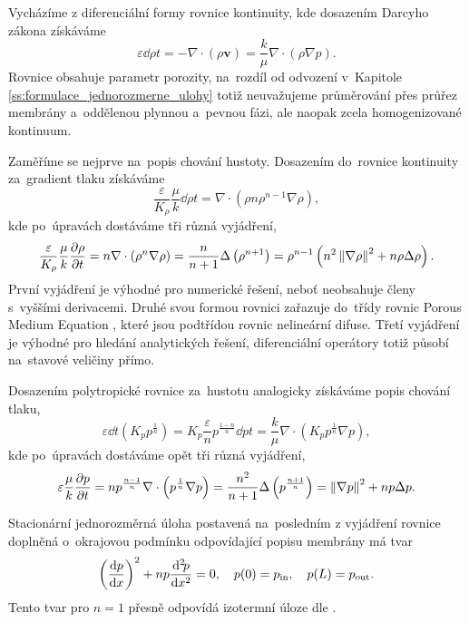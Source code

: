 Vycházíme z diferenciální formy rovnice kontinuity, kde dosazením Darcyho zákona získáváme
\begin{equation}
    \varepsilon \dd{\rho}{t}=-\nabla\cdot \left(\rho \bm{v}\right)=\frac{k}{\mu}\nabla\cdot\left(\rho\nabla p\right).
\end{equation}
Rovnice obsahuje parametr porozity, na~rozdíl od odvození v~Kapitole \ref{ss:formulace_jednorozmerne_ulohy} totiž neuvažujeme průměrování přes průřez membrány a~oddělenou plynnou a~pevnou fázi, ale naopak zcela homogenizované kontinuum.

Zaměříme se nejprve na~popis chování hustoty. Dosazením do~rovnice kontinuity za~gradient tlaku získáváme
\begin{equation}
    \frac{\varepsilon}{K_\rho} \frac{\mu}{k}\dd{\rho}{t}
    =\nabla\cdot\left(\rho n \rho^{n-1}\nabla \rho\right),
\end{equation}
kde po~úpravách dostáváme tři různá vyjádření,
\begin{equation}\label{eq:pme_density_3D}
    \frac{\varepsilon}{K_\rho} \frac{\mu}{k}\frac{\partial \rho}{\partial t}
    = n \nabla\cdot\left(\rho^n \nabla \rho\right)
    =\frac{n}{n+1}\Delta\left(\rho^{n+1}\right)
    =\rho^{n-1}\left(n^2\left\lVert\nabla\rho\right\rVert^2+n\rho\Delta\rho\right).
\end{equation}
První vyjádření je výhodné pro numerické řešení, neboť neobsahuje členy s~vyššími derivacemi. Druhé svou formou rovnici zařazuje do~třídy rovnic Porous Medium Equation \cite{vazquez2006}, které jsou podtřídou rovnic nelineární difuse. Třetí vyjádření je výhodné pro hledání analytických řešení, diferenciální operátory totiž působí na~stavové veličiny přímo.

Dosazením polytropické rovnice za~hustotu analogicky získáváme popis chování tlaku,
\begin{equation}\label{eq:pme_pressure_time_3D}
    \varepsilon \dd{}{t}\left(K_p p^{\frac{1}{n}}\right)
    =K_p \frac{\varepsilon}{n}p^{\frac{1-n}{n}}\dd{p}{t}
    =\frac{k}{\mu}\nabla\cdot\left(K_p p^{\frac{1}{n}}\nabla p\right),
\end{equation}
kde po~úpravách dostáváme opět tři různá vyjádření,
\begin{equation}\label{eq:pme_pressure_3D}
    \varepsilon \frac{\mu}{k}\frac{\partial p}{\partial t}
    = n p^{\frac{n-1}{n}} \nabla\cdot\left( p^{\frac{1}{n}}\nabla p\right)
    = \frac{n^2}{n+1}\Delta\left(p^{\frac{n+1}{n}}\right)
    = \left\lVert\nabla p\right\rVert^2 + n p\Delta p.
\end{equation}

Stacionární jednorozměrná úloha postavená na~posledním z vyjádření rovnice  doplněná o~okrajovou podmínku odpovídající popisu membrány má tvar
\begin{equation}\label{eq:pme_pressure_1D}
    \left(\frac{\mathrm{d} p}{\mathrm{d} x}\right)^2 + n p\frac{\mathrm{d}^2 \! p}{\mathrm{d} x^2} = 0,\quad p(0)=p_{\mathrm{in}},\quad p(L)=p_{\mathrm{out}}.
\end{equation}
Tento tvar pro $n=1$ přesně odpovídá izotermní úloze dle .

